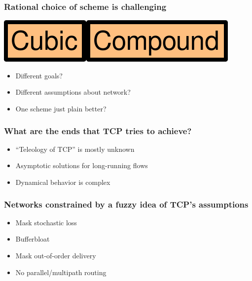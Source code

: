 \documentclass[svgnames]{beamer}
\newcommand{\ssline}{\vspace{8 pt}}
\begin{document}
\begin{frame}
\frametitle{Rational choice of scheme is challenging}

\begin{centering}
\includegraphics[height=20 pt]{cubic.pdf}\hspace{8 pt}{\bf vs.}\hspace{8 pt}\includegraphics[height=20 pt]{compound.pdf}

\end{centering}

\ssline
\ssline
\ssline

\begin{itemize}

\Large

\item Different goals?

\item Different assumptions about network?

\item One scheme just plain better?

\end{itemize}

\end{frame}

\begin{frame}
\frametitle{What are the ends that TCP tries to achieve?}

\begin{itemize}

\Large

\item ``Teleology of TCP'' is mostly unknown

\item Asymptotic solutions for long-running flows

\item Dynamical behavior is complex

\end{itemize}

\end{frame}

\begin{frame}
\frametitle{Networks constrained by a fuzzy idea of TCP's assumptions}

\Large

\begin{itemize}
\item Mask stochastic loss
\item Bufferbloat
\item Mask out-of-order delivery
\item No parallel/multipath routing
\end{itemize}

\end{frame}
\end{document}
